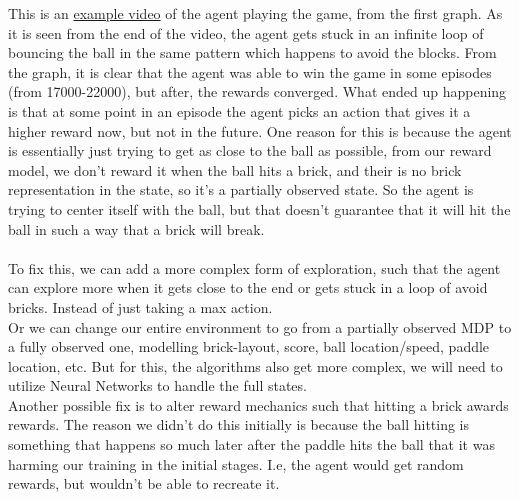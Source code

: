 \documentclass[twoside,11pt]{article}
\begin{document}
This is an \href{https://github.com/duoduocai-dot/csc498-project/blob/main/pictures_and_videos/incorrect_double_q_learning_maximization_bias_example.mkv}{example video} of the agent playing the game, from  the first graph. As it is seen from the end of the  video, the agent gets stuck in an infinite loop of bouncing the ball in the same pattern which happens to avoid the blocks. From the graph, it is clear that the agent was able to win the game in some episodes (from 17000-22000), but after, the rewards converged. What ended up happening is that at some point in an episode the agent picks an action that gives it a higher reward now, but not in the future. One reason for this is because the agent is essentially just trying to get as close to the ball as possible, from our reward model, we don't reward it when the ball hits a brick, and their is no brick representation in the state, so it's a partially observed state. So the agent is trying to center itself with the ball, but that doesn't guarantee that it will hit the ball in such a way that a brick will break.
\\\\
To fix this, we can add a more complex form of exploration, such that the agent can explore more when it gets close to the end or gets stuck in a loop of avoid bricks. Instead of just taking a max action.
\\
Or we can change our entire environment to go from a partially observed MDP to a fully observed one, modelling brick-layout, score, ball location/speed, paddle location, etc. But for this, the algorithms also get more complex, we will need to utilize Neural Networks to handle the full states.
\\
Another possible fix is to alter reward mechanics such that hitting a brick awards rewards. The reason we didn't do this initially is because the ball hitting is something that happens so much later after the paddle hits the ball that it was harming our training in the initial stages. I.e, the agent would get random rewards, but wouldn't be able to recreate it.
\end{document}
